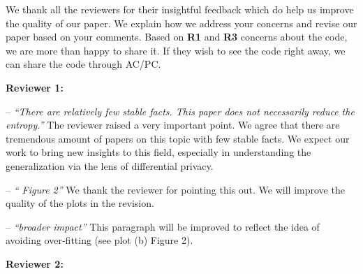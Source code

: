 \documentclass{article}
\begin{document}
We thank all the reviewers for their insightful feedback which do help us improve the quality of our paper. We explain how we address your concerns and revise our paper based on your comments. Based on \textbf{R1} and \textbf{R3} concerns about the code, we are more than happy to share it. 
If they wish to see the code right away, we can share the code through AC/PC. 

\textbf{Reviewer 1:}
\vspace{-4pt}

-- \textit{ ``There are relatively few stable facts. This paper does not necessarily reduce the entropy.''}
The reviewer raised a very important point. We agree that there are tremendous amount of papers on this topic with few stable facts. We expect our work to bring new insights to this field, especially in understanding the generalization via the lens of differential privacy.\vspace{-4pt} 

-- \textit{ `` Figure 2''}
We thank the reviewer for pointing this out. We will improve the quality of the plots in the revision.\vspace{-4pt}

-- \textit{ ``broader impact''} This paragraph will be improved to reflect the idea of avoiding over-fitting (see plot (b) Figure 2).


\textbf{Reviewer 2:} \vspace{-4pt}
\end{document}
